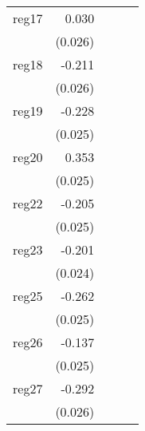 {\begin{longtable}{l*{4}{D{.}{.}{-1}}}
\addlinespace
reg17       &       0.030         &                     &                     &                     \\
            &     (0.026)         &                     &                     &                     \\
\addlinespace
reg18       &      -0.211\sym{***}&                     &                     &                     \\
            &     (0.026)         &                     &                     &                     \\
\addlinespace
reg19       &      -0.228\sym{***}&                     &                     &                     \\
            &     (0.025)         &                     &                     &                     \\
\addlinespace
reg20       &       0.353\sym{***}&                     &                     &                     \\
            &     (0.025)         &                     &                     &                     \\
\addlinespace
reg22       &      -0.205\sym{***}&                     &                     &                     \\
            &     (0.025)         &                     &                     &                     \\
\addlinespace
reg23       &      -0.201\sym{***}&                     &                     &                     \\
            &     (0.024)         &                     &                     &                     \\
\addlinespace
reg25       &      -0.262\sym{***}&                     &                     &                     \\
            &     (0.025)         &                     &                     &                     \\
\addlinespace
reg26       &      -0.137\sym{***}&                     &                     &                     \\
            &     (0.025)         &                     &                     &                     \\
\addlinespace
reg27       &      -0.292\sym{***}&                     &                     &                     \\
            &     (0.026)         &                     &                     &                     \\

\end{longtable}}
